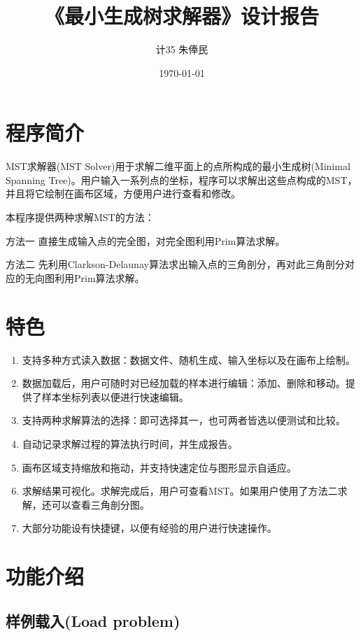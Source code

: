 \documentclass[11pt, a4paper]{article}
\title{\hei 《最小生成树求解器》设计报告}
\author{\kai \quad 计35 \quad 朱俸民 \quad 2012011894}
\date{\kai \today}
\newcommand{\hei}{\CJKfamily{hei}}
\begin{document}
	\maketitle

	\section{程序简介}
	
	MST求解器(MST Solver)用于求解二维平面上的点所构成的最小生成树(Minimal Spanning Tree)。用户输入一系列点的坐标，程序可以求解出这些点构成的MST，并且将它绘制在画布区域，方便用户进行查看和修改。

	本程序提供两种求解MST的方法：

	{\hei 方法一} \quad 直接生成输入点的完全图，对完全图利用Prim算法求解。

	{\hei 方法二} \quad 先利用Clarkson-Delaunay算法求出输入点的三角剖分，再对此三角剖分对应的无向图利用Prim算法求解。

	\section{特色}

	\begin{enumerate}
		\item 支持多种方式读入数据：数据文件、随机生成、输入坐标以及在画布上绘制。
		\item 数据加载后，用户可随时对已经加载的样本进行编辑：添加、删除和移动。提供了样本坐标列表以便进行快速编辑。
		\item 支持两种求解算法的选择：即可选择其一，也可两者皆选以便测试和比较。
		\item 自动记录求解过程的算法执行时间，并生成报告。
		\item 画布区域支持缩放和拖动，并支持快速定位与图形显示自适应。
		\item 求解结果可视化。求解完成后，用户可查看MST。如果用户使用了{\hei 方法二}求解，还可以查看三角剖分图。
		\item 大部分功能设有快捷键，以便有经验的用户进行快速操作。
	\end{enumerate}

	\section{功能介绍}
		
		\subsection{样例载入(Load problem)}
		
\end{document}
